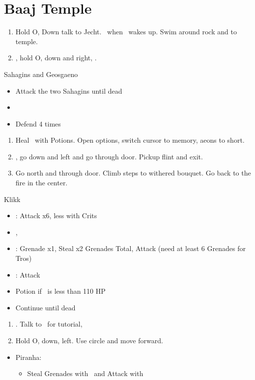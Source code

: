 \chapter{Baaj Temple}

\begin{enumerate}
	\item Hold O, Down talk to Jecht. \sd \ when \tidus \ wakes up. Swim around rock and to temple.
	\item \cs, hold O, down and right, \cs.
\end{enumerate}
\begin{battle}{Sahagins and Geosgaeno}
	\begin{itemize}
		\item Attack the two Sahagins until dead
		\item \cs[0:30]
		\item Defend 4 times
	\end{itemize}
\end{battle}
\begin{enumerate}[resume]
	\item Heal \tidus \ with Potions. Open options, switch cursor to memory, aeons to short.
	\item \cs, go down and left and go through door. Pickup flint and exit.
	\item Go north and through door. Climb steps to withered bouquet. Go back to the fire in the center. \cs[2:10]
\end{enumerate}
\begin{battle}[1500]{Klikk}
	\begin{itemize}
		\item \tidus: Attack x6, less with Crits
		\item \cs, \sd
		\item \rikku: Grenade x1, Steal x2 Grenades Total, Attack (need at least 6 Grenades for Tros)
		\item \tidus: Attack
		\item Potion if \tidus \ is less than 110 HP
		\item Continue until dead
	\end{itemize}
\end{battle}
\begin{enumerate}[resume]
	\item \cs[2:30]. Talk to \rikku \ for tutorial, \sd
	\item Hold O, down, left. Use circle and move forward.
\end{enumerate}
\begin{encounters}
	\begin{itemize}
		\item Piranha:
		      \begin{itemize}
			      \item Steal Grenades with \rikku \ and Attack with \tidus
		      \end{itemize}
	\end{itemize}
\end{encounters}
